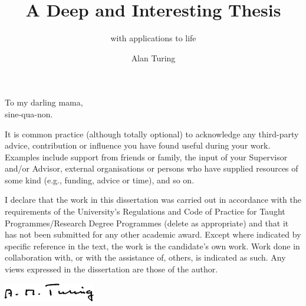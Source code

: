 \documentclass[
  bibstyle=acmauthoryear, %
]{uob-thesis}
\title{A Deep and Interesting Thesis}
\subtitle{with applications to life}
\author{Alan Turing}
\date{\printdatewithoutmonth{thesisdate}}
\begin{document}

\hypersetup{pageanchor=false}
\maketitle
\cleardoubleoddemptypage

\begin{abstract}
  
\end{abstract}

\begin{dedication}
  To my darling mama,\\
  sine-qua-non.
\end{dedication}

\begin{acknowledgements}
It is common practice (although totally optional) to acknowledge any third-party
advice, contribution or influence you have found useful during your work.
Examples include support from friends or family, the input of your Supervisor
and/or Advisor, external organisations or persons who  have supplied resources
of some kind (e.g., funding, advice or time), and so on.
\end{acknowledgements}

\begin{declaration}
  I declare that the work in this dissertation was carried out in accordance
  with the requirements of the University's Regulations and Code of Practice for
  Taught Programmes/Research Degree Programmes {\color{red} (delete as
  appropriate)} and that it has not been submitted for any other academic award.
  Except where indicated by specific reference in the text, the work is the
  candidate's own work. Work done in collaboration with, or with the assistance
  of, others, is indicated as such. Any views expressed in the
  dissertation are those of the author.
  
  \vspace{2cm}

  \includegraphics[width=4cm]{sig}
\end{declaration}

\hypersetup{pageanchor=true}
\end{document}
